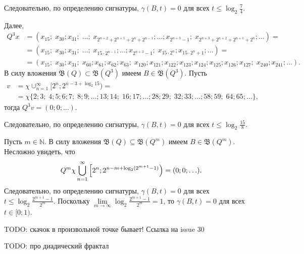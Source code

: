 \documentclass[a4paper,14pt]{article} %
\theoremstyle{plain}
\begin{document}
Следовательно, по определению сигнатуры, $\gamma(B, t) = 0$ для всех
$t \leqslant \log_2 \frac 74$.

Далее,
\begin{align*}
	Q^3 x &= (x_{15}; \; x_{30}; x_{31}; \; \ldots; \;
	x_{2^{n + 2} + 2^{n + 1} + 2^n + 2^{n - 1}}; \ldots; x_{2^{n + 3} - 1}; \;
	x_{2^{n + 3} + 2^{n + 2} + 2^{n + 1} + 2^n}; \ldots) = \\
	&= (x_{15}; \; x_{30}; x_{31}; \; \ldots; \;
	x_{15 \cdot 2^{n - 1}}; \ldots; x_{2^{n + 3} - 1}; \;
	x_{15 \cdot 2^n}; x_{15 \cdot 2^n + 1}; \ldots) = \\
	&= (x_{15}; \; x_{30}; x_{31}; \; x_{60}; x_{61}; x_{62}; x_{63}; \;
	x_{120}; x_{121}; x_{122}; x_{123}; x_{124}; x_{125}; x_{126}; x_{127}; \;
	x_{240}; x_{241}; \ldots).
\end{align*}
В силу вложения $\mathfrak B(Q) \subset \mathfrak B(Q^3)$ имеем
$B \in \mathfrak B(Q^3)$. Пусть
\begin{align*}
	v &= \chi \cup^\infty_{n = 1} [2^n; 2^{n - 3 + \log_2 15}) = \\
	&= \chi\{2; 3; \; 4; 5; 6; 7; \; 8; 9; \ldots; 13; 14; \;
	16; 17; \ldots; 28; 29; \; 32; 33; \ldots; 58; 59; \; 64; 65; \ldots\},
\end{align*}
тогда $Q^3 v = (0; 0; \ldots)$.

Следовательно, по определению сигнатуры, $\gamma(B, t) = 0$ для всех
$t \leqslant \log_2 \frac{15}8$.

Пусть $m \in \mathbb N$. В силу вложения $\mathfrak B(Q) \subseteq \mathfrak B(Q^m)$
имеем $B \in \mathfrak B(Q^m)$. Несложно увидеть, что
$$
	Q^m \chi \bigcup^\infty_{n = 1} \Big{[}2^n; 2^{n - m + \log_2 (2^{m + 1} - 1)}\Big) =
	(0; 0; \ldots).
$$
Следовательно, по определению сигнатуры, $\gamma(B, t) = 0$ для всех
$t \leqslant \log_2 \frac{2^{m + 1} - 1}{2^m}$. Поскольку
$\lim\limits_{m \to \infty} \log_2 \frac{2^{m + 1} - 1}{2^m} = 1$,
то $\gamma(B, t) = 0$ для всех $t \in {[}0; 1)$.




TODO: скачок в произвольной точке бывает! Ссылка на issue 30

TODO: про диадический фрактал

\printbibliography{}
\end{document}
